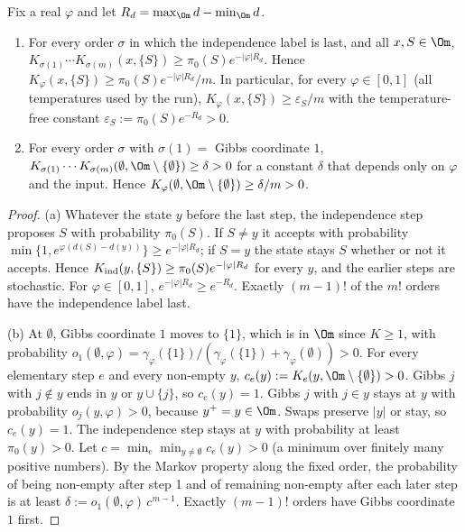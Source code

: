 \documentclass[11pt]{report}
\begin{document}
\begin{T12lemma}[positivity]\label{T12:lem:pos}
Fix a real $\varphi$ and let $R_d=\max_\Om d-\min_\Om d$.
\begin{enumerate}[label=(\alph*)]
\item For every order $\sigma$ in which the independence label is last, and all $x,S\in\Om$, $K_{\sigma(1)}\cdots K_{\sigma(m)}(x,\{S\})\ge \pi_0(S)e^{-|\varphi|R_d}$. Hence $K_\varphi(x,\{S\})\ge \pi_0(S)e^{-|\varphi|R_d}/m$. In particular, for every $\varphi\in[0,1]$ (all temperatures used by the run), $K_\varphi(x,\{S\})\ge\varepsilon_S/m$ with the temperature-free constant $\varepsilon_S:=\pi_0(S)e^{-R_d}>0$.
\item For every order $\sigma$ with $\sigma(1)=$ Gibbs coordinate $1$, $K_{\sigma(1)}\cdots K_{\sigma(m)}(\emptyset,\Om\setminus\{\emptyset\})\ge \delta>0$ for a constant $\delta$ that depends only on $\varphi$ and the input. Hence $K_\varphi(\emptyset,\Om\setminus\{\emptyset\})\ge \delta/m>0$.
\end{enumerate}
\end{T12lemma}
\begin{proof}
(a) Whatever the state $y$ before the last step, the independence step proposes $S$ with probability $\pi_0(S)$. If $S\ne y$ it accepts with probability $\min\{1,e^{\varphi(d(S)-d(y))}\}\ge e^{-|\varphi|R_d}$; if $S=y$ the state stays $S$ whether or not it accepts. Hence $K_{\rm ind}(y,\{S\})\ge\pi_0(S)e^{-|\varphi|R_d}$ for every $y$, and the earlier steps are stochastic. For $\varphi\in[0,1]$, $e^{-|\varphi|R_d}\ge e^{-R_d}$. Exactly $(m-1)!$ of the $m!$ orders have the independence label last.

(b) At $\emptyset$, Gibbs coordinate $1$ moves to $\{1\}$, which is in $\Om$ since $K\ge1$, with probability $o_1(\emptyset,\varphi)=\gamma_\varphi(\{1\})/(\gamma_\varphi(\{1\})+\gamma_\varphi(\emptyset))>0$. For every elementary step $e$ and every non-empty $y$, $c_e(y):=K_e(y,\Om\setminus\{\emptyset\})>0$. Gibbs $j$ with $j\notin y$ ends in $y$ or $y\cup\{j\}$, so $c_e(y)=1$. Gibbs $j$ with $j\in y$ stays at $y$ with probability $o_j(y,\varphi)>0$, because $y^+=y\in\Om$. Swaps preserve $|y|$ or stay, so $c_e(y)=1$. The independence step stays at $y$ with probability at least $\pi_0(y)>0$. Let $c=\min_e\min_{y\ne\emptyset}c_e(y)>0$ (a minimum over finitely many positive numbers). By the Markov property along the fixed order, the probability of being non-empty after step 1 and of remaining non-empty after each later step is at least $\delta:=o_1(\emptyset,\varphi)\,c^{m-1}$. Exactly $(m-1)!$ orders have Gibbs coordinate $1$ first.
\end{proof}
\end{document}
